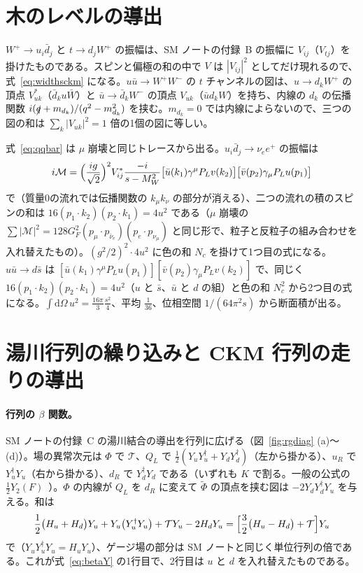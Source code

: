 \documentclass[a4paper,10pt]{ltjsarticle}
\newcommand{\dd}{\mathrm{d}}
\begin{document}
\section{木のレベルの導出}\label{app:tree}

$W^+\to u_i\bar d_j$ と $t\to d_jW^+$ の振幅は、SM ノートの付録~B の振幅に $V_{ij}$（$V_{tj}$）を掛けたものである。スピンと偏極の和の中で $V$ は $|V_{ij}|^2$ としてだけ現れるので、式~\eqref{eq:widthsckm} になる。$u\bar u\to W^+W^-$ の $t$ チャンネルの図は、$u\to d_kW^+$ の頂点 $V_{uk}^*$（$\bar d_ku\bar W$）と $\bar u\to\bar d_kW^-$ の頂点 $V_{uk}$（$\bar ud_kW$）を持ち、内線の $d_k$ の伝播関数 $i(\slashed q+m_{d_k})/(q^2-m_{d_k}^2)$ を挟む。$m_{d_k}=0$ では内線によらないので、三つの図の和は $\sum_k|V_{uk}|^2=1$ 倍の1個の図に等しい。

式~\eqref{eq:qqbar} は $\mu$ 崩壊と同じトレースから出る。$u_i\bar d_j\to\nu_ee^+$ の振幅は
\begin{equation*}
i\mathcal M=\Bigl(\frac{ig}{\sqrt2}\Bigr)^2V_{ij}^*\frac{-i}{s-M_W^2}\bigl[\bar u(k_1)\gamma^\mu P_Lv(k_2)\bigr]\bigl[\bar v(p_2)\gamma_\mu P_Lu(p_1)\bigr]
\end{equation*}
で（質量0の流れでは伝播関数の $k_\mu k_\nu$ の部分が消える）、二つの流れの積のスピンの和は $16(p_1\cdot k_2)(p_2\cdot k_1)=4u^2$ である（$\mu$ 崩壊の $\sum|\mathcal M|^2=128G_F^2(p_\mu\cdot p_{\bar\nu_e})(p_e\cdot p_{\nu_\mu})$ と同じ形で、粒子と反粒子の組み合わせを入れ替えたもの）。$(g^2/2)^2\cdot4u^2$ に色の和 $N_c$ を掛けて1つ目の式になる。$u\bar u\to d\bar s$ は $[\bar u(k_1)\gamma^\mu P_Lu(p_1)][\bar v(p_2)\gamma_\mu P_Lv(k_2)]$ で、同じく $16(p_1\cdot k_2)(p_2\cdot k_1)=4u^2$（$u$ と $\bar s$、$\bar u$ と $d$ の組）と色の和 $N_c^2$ から2つ目の式になる。$\int\dd\Omega\,u^2=\frac{16\pi}3\frac{s^2}4$、平均 $\frac1{36}$、位相空間 $1/(64\pi^2s)$ から断面積が出る。

\section{湯川行列の繰り込みと CKM 行列の走りの導出}\label{app:rg}

\paragraph{行列の $\beta$ 関数。}SM ノートの付録~C の湯川結合の導出を行列に広げる（図~\ref{fig:rgdiag} (a)〜(d)）。場の異常次元は $\Phi$ で $\mathcal T$、$Q_L$ で $\frac12(Y_uY_u^\dagger+Y_dY_d^\dagger)$（左から掛かる）、$u_R$ で $Y_u^\dagger Y_u$（右から掛かる）、$d_R$ で $Y_d^\dagger Y_d$ である（いずれも $K$ で割る。一般の公式の $\frac12Y_2(F)$~\cite{mv1}）。$\Phi$ の内線が $Q_L$ を $d_R$ に変えて $\tilde\Phi$ の頂点を挟む図は $-2Y_dY_d^\dagger Y_u$ を与える。和は
\begin{equation*}
\frac12\bigl(H_u+H_d\bigr)Y_u+Y_u\bigl(Y_u^\dagger Y_u\bigr)+\mathcal TY_u-2H_dY_u=\Bigl[\frac32\bigl(H_u-H_d\bigr)+\mathcal T\Bigr]Y_u
\end{equation*}
で（$Y_uY_u^\dagger Y_u=H_uY_u$）、ゲージ場の部分は SM ノートと同じく単位行列の倍である。これが式~\eqref{eq:betaY} の1行目で、2行目は $u$ と $d$ を入れ替えたものである。
\end{document}
